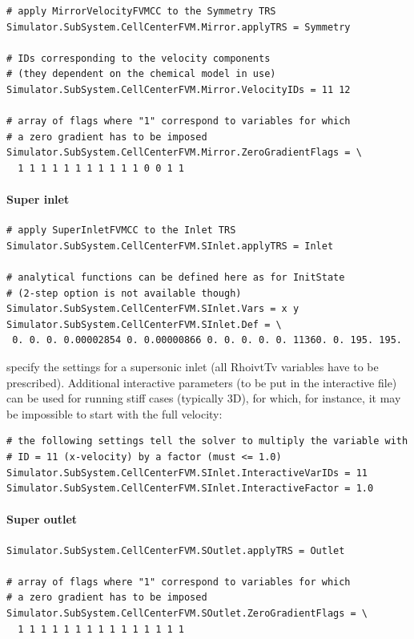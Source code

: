\documentclass[11pt]{article}
\begin{document}
\begin{verbatim}
# apply MirrorVelocityFVMCC to the Symmetry TRS 
Simulator.SubSystem.CellCenterFVM.Mirror.applyTRS = Symmetry

# IDs corresponding to the velocity components 
# (they dependent on the chemical model in use)
Simulator.SubSystem.CellCenterFVM.Mirror.VelocityIDs = 11 12

# array of flags where "1" correspond to variables for which 
# a zero gradient has to be imposed
Simulator.SubSystem.CellCenterFVM.Mirror.ZeroGradientFlags = \
  1 1 1 1 1 1 1 1 1 1 1 0 0 1 1
\end{verbatim}

\paragraph{Super inlet}

\begin{verbatim}
# apply SuperInletFVMCC to the Inlet TRS
Simulator.SubSystem.CellCenterFVM.SInlet.applyTRS = Inlet

# analytical functions can be defined here as for InitState 
# (2-step option is not available though)
Simulator.SubSystem.CellCenterFVM.SInlet.Vars = x y
Simulator.SubSystem.CellCenterFVM.SInlet.Def = \
 0. 0. 0. 0.00002854 0. 0.00000866 0. 0. 0. 0. 0. 11360. 0. 195. 195.
\end{verbatim}
specify the settings for a supersonic inlet (all RhoivtTv variables have to be prescribed).
Additional interactive parameters (to be put in the interactive file) can be used 
for running stiff cases (typically 3D), for which, for instance, it may be impossible 
to start with the full velocity:

\begin{verbatim}
# the following settings tell the solver to multiply the variable with 
# ID = 11 (x-velocity) by a factor (must <= 1.0)
Simulator.SubSystem.CellCenterFVM.SInlet.InteractiveVarIDs = 11
Simulator.SubSystem.CellCenterFVM.SInlet.InteractiveFactor = 1.0
\end{verbatim}

\paragraph{Super outlet}

\begin{verbatim}
Simulator.SubSystem.CellCenterFVM.SOutlet.applyTRS = Outlet

# array of flags where "1" correspond to variables for which 
# a zero gradient has to be imposed
Simulator.SubSystem.CellCenterFVM.SOutlet.ZeroGradientFlags = \
  1 1 1 1 1 1 1 1 1 1 1 1 1 1 1
\end{verbatim}
\end{document}
